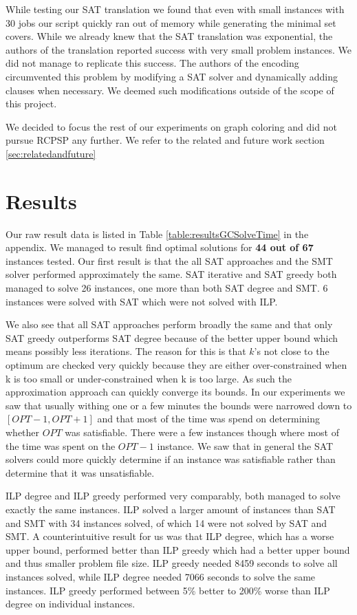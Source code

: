 \documentclass{sig-alternate}
\begin{document}
While testing our SAT translation we found that even with small instances with 30 jobs our script quickly ran out of memory while generating the minimal set covers.
While we already knew that the SAT translation was exponential, the authors of the translation reported success with very small problem instances. We did not manage to replicate this success.
The authors of the encoding circumvented this problem by modifying a SAT solver and dynamically adding clauses when necessary.
We deemed such modifications outside of the scope of this project.

We decided to focus the rest of our experiments on graph coloring and did not pursue RCPSP any further.
We refer to the related and future work section \ref{sec:relatedandfuture}

\section{Results}

Our raw result data is listed in Table \ref{table:resultsGCSolveTime} in the appendix.
We managed to result find optimal solutions for \textbf{44 out of 67} instances tested.
Our first result is that the all SAT approaches and the SMT solver performed approximately the same.
SAT iterative and SAT greedy both managed to solve 26 instances, one more than both SAT degree and SMT.
6 instances were solved with SAT which were not solved with ILP.

We also see that all SAT approaches perform broadly the same and that only SAT greedy outperforms SAT degree because of the better upper bound which means possibly less iterations.
The reason for this is that $k$'s not close to the optimum are checked very quickly because they are either over-constrained when k is too small or under-constrained when k is too large.
As such the approximation approach can quickly converge its bounds.
In our experiments we saw that usually withing one or a few minutes the bounds were narrowed down to $[OPT-1, OPT+1]$ and that most of the time was spend on determining whether $OPT$ was satisfiable.
There were a few instances though where most of the time was spent on the $OPT-1$ instance.
We saw that in general the SAT solvers could more quickly determine if an instance was satisfiable rather than determine that it was unsatisfiable.

ILP degree and ILP greedy performed very comparably, both managed to solve exactly the same instances.
ILP solved a larger amount of instances than SAT and SMT with 34 instances solved, of which 14 were not solved by SAT and SMT.
A counterintuitive result for us was that ILP degree, which has a worse upper bound, performed better than ILP greedy which had a better upper bound and thus smaller problem file size.
ILP greedy needed 8459 seconds to solve all instances solved, while ILP degree needed 7066 seconds to solve the same instances.
ILP greedy performed between 5\% better to 200\% worse than ILP degree on individual instances.
\end{document}
